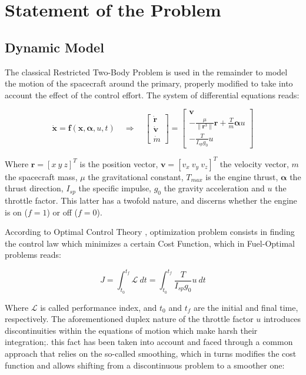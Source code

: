 \section{Statement of the Problem}
\label{statement}

\subsection{Dynamic Model}

The classical Restricted Two-Body Problem is used in the remainder to model the motion of the spacecraft around the primary, properly modified to take into account the effect of the control effort. The system of differential equations reads:

\begin{equation}
\mathbf{\dot{x}} = \mathbf{f}(\mathbf{x}, \boldsymbol{\alpha}, u, t)
\quad
\Rightarrow
\quad
\begin{bmatrix}
\mathbf{\dot{r}} \\ \mathbf{\dot{v}} \\ \dot{m}
\end{bmatrix}
=
\begin{bmatrix}
\mathbf{v} \\
-\frac{\mu}{\parallel \mathbf{r}^3 \parallel} \mathbf{r} + \frac{T}{m} \boldsymbol{\alpha} u \\
- \frac{T}{I_{sp} g_0} u
\end{bmatrix}
\end{equation}

Where $\mathbf{r} = [ x~y~z]^T$ is the position vector, $\mathbf{v} = [v_x~v_y~v_z]^T$ the velocity vector, $m$ the spacecraft mass, $\mu$ the gravitational constant, $T_{max}$ is the engine thrust, $\boldsymbol{\alpha}$ the thrust direction, $I_{sp}$ the specific impulse, $g_0$ the gravity acceleration and $u$ the throttle factor. This latter has a twofold nature, and discerns whether the engine is on ($f=1$) or off ($f=0$).

According to Optimal Control Theory \cite{bryson}, optimization problem consists in finding the control law which minimizes a certain Cost Function, which in Fuel-Optimal problems reads: 

\begin{equation}
J = \int_{t_0}^{t_f} \mathcal{L}~dt = \int_{t_0}^{t_f} \frac{T}{I_{sp} g_0} u~dt
\end{equation}

Where $\mathcal{L}$ is called performance index, and $t_0$ and $t_f$ are the initial and final time, respectively. The aforementioned duplex nature of the throttle factor $u$ introduces discontinuities within the equations of motion which make harsh their integration;. this fact has been taken into account and faced through a common approach that relies on the so-called smoothing, which in turns modifies the cost function and allows shifting from a discontinuous problem to a smoother one:

